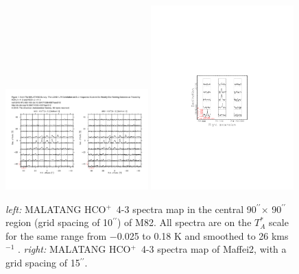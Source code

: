 \documentclass[legal,11pt]{article}
\def\arcsec {\hbox{$^{\prime\prime}$}}
\def\,{\thinspace}
\def\HCOP       {HCO$^{+}$}
\begin{document}
\begin{figure}
\centering

\includegraphics[width=0.49\textwidth]{Tan_M82.pdf}
\includegraphics[width=0.49\textwidth]{maffei2-hco+.pdf}
\caption{
{\it left:} MALATANG \HCOP\ 4-3 spectra map in the central 90\arcsec $\times$ 90\arcsec region (grid spacing of 10\arcsec) of M82. All spectra are on the $T_A^*$ scale for the same range from −0.025 to 0.18 K and smoothed to 26 km\,s$^{−1}$ \citep{Tan:2018}. 
{\it right:} MALATANG \HCOP\ 4-3 spectra map of Maffei2, with a grid spacing of 15\arcsec.
}
\label{fig:maffei2}
\end{figure}
\end{document}
